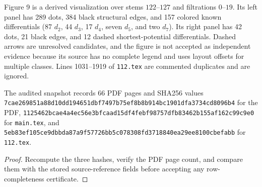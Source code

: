\begin{definition}
  \label{def:near126-figure-contract}
  \notready
  Figure 9 is a derived visualization over stems $122$--$127$ and filtrations
  $0$--$19$.  Its left panel has 289 dots, 384 black structural edges, and 157
  colored known differentials (87 $d_2$, 44 $d_3$, 17 $d_4$, seven $d_5$,
  and two $d_7$).  Its right panel has 42 dots, 21 black edges, and 12 dashed
  shortest-potential differentials.  Dashed arrows are unresolved candidates,
  and the figure is not accepted as independent evidence because its source
  has no complete legend and uses layout offsets for multiple classes.  Lines
  1031--1919 of \texttt{112.tex} are commented duplicates and are ignored.
\end{definition}

\begin{proposition}
  \label{prop:paper-source-snapshot}
  \notready
  The audited snapshot records 66 PDF pages and SHA256 values
  \texttt{7cae269851a88d10dd194651dbf7497b75ef8b8b914bc1901dfa3734cd8096b4}
  for the PDF,
  \texttt{1125462bcae4a4ec56e3bfcaad15df4febf98757dfb83462b155af162c99c9e0}
  for \texttt{main.tex}, and
  \texttt{5eb83ef105ce9dbbda87a9f57726bb5c078308fd3718840ea29ee8100cbefabb}
  for \texttt{112.tex}.
\end{proposition}

\begin{proof}
  Recompute the three hashes, verify the PDF page count, and compare them with
  the stored source-reference fields before accepting any row-completeness
  certificate.
\end{proof}
